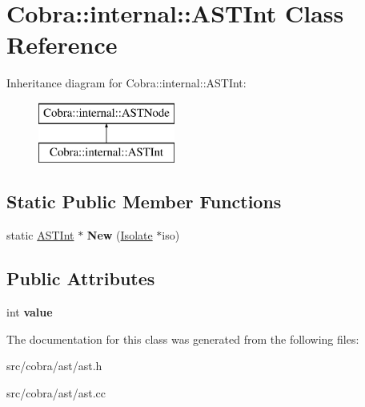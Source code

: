 \hypertarget{class_cobra_1_1internal_1_1_a_s_t_int}{\section{Cobra\+:\+:internal\+:\+:A\+S\+T\+Int Class Reference}
\label{class_cobra_1_1internal_1_1_a_s_t_int}
}
Inheritance diagram for Cobra\+:\+:internal\+:\+:A\+S\+T\+Int\+:\begin{figure}[H]
\begin{center}
\leavevmode
\includegraphics[height=2.000000cm]{class_cobra_1_1internal_1_1_a_s_t_int}
\end{center}
\end{figure}
\subsection*{Static Public Member Functions}
\begin{DoxyCompactItemize}
\item 
\hypertarget{class_cobra_1_1internal_1_1_a_s_t_int_a654bf0730b94d4c521773c15f1475960}{static \hyperlink{class_cobra_1_1internal_1_1_a_s_t_int}{A\+S\+T\+Int} $\ast$ {\bfseries New} (\hyperlink{class_cobra_1_1internal_1_1_isolate}{Isolate} $\ast$iso)}\label{class_cobra_1_1internal_1_1_a_s_t_int_a654bf0730b94d4c521773c15f1475960}

\end{DoxyCompactItemize}
\subsection*{Public Attributes}
\begin{DoxyCompactItemize}
\item 
\hypertarget{class_cobra_1_1internal_1_1_a_s_t_int_a6ef1cdf248b70931f64345d3b37c4d77}{int {\bfseries value}}\label{class_cobra_1_1internal_1_1_a_s_t_int_a6ef1cdf248b70931f64345d3b37c4d77}

\end{DoxyCompactItemize}


The documentation for this class was generated from the following files\+:\begin{DoxyCompactItemize}
\item 
src/cobra/ast/ast.\+h\item 
src/cobra/ast/ast.\+cc\end{DoxyCompactItemize}
